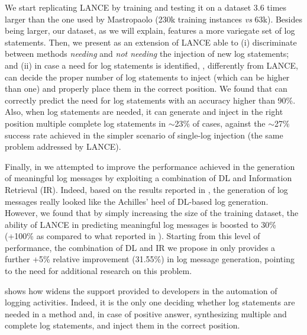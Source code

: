 We start replicating LANCE by training and testing it on a dataset 3.6 times larger than the one used by Mastropaolo \etal \cite{mastropaolo2022using} (230k training instances \emph{vs} 63k). Besides being larger, our dataset, as we will explain, features a more variegate set of log statements. Then, we present \approach as an extension of LANCE able to (i) discriminate between methods \emph{needing} and \emph{not needing} the injection of new log statements; and (ii) in case a need for log statements is identified, \approach, differently from LANCE, can decide the proper number of log statements to inject (which can be higher than one) and properly place them in the correct position. We found that \approach can correctly predict the need for log statements with an accuracy higher than 90\%. Also, when log statements are needed, it can generate and inject in the right position multiple complete log statements in $\sim$23\% of cases, against the $\sim$27\% success rate achieved in the simpler scenario of single-log injection (\ie the same problem addressed by LANCE).   

Finally, in \approach we attempted to improve the performance achieved in the generation of meaningful log messages by exploiting a combination of DL and Information Retrieval (IR). Indeed, based on the results reported in \cite{mastropaolo2022using}, the generation of log messages really looked like the Achilles' heel of DL-based log generation. However, we found that by simply increasing the size of the training dataset, the ability of LANCE in predicting meaningful log messages is boosted to 30\% (+100\% as compared to what reported in \cite{mastropaolo2022using}). Starting from this level of performance, the combination of DL and IR we propose in \approach only provides a further +5\% relative improvement (31.55\%) in log message generation, pointing to the need for additional research on this problem.

 shows how \approach widens the support provided to developers in the automation of logging activities. Indeed, it is the only one deciding whether log statements are needed in a method and, in case of positive answer, synthesizing multiple and complete log statements, and inject them in the correct position. 

